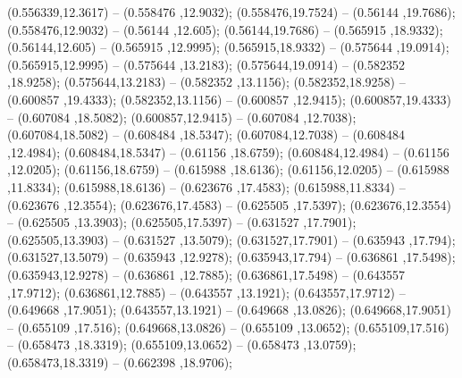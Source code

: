  (0.556339,12.3617) -- (0.558476 ,12.9032);
 (0.558476,19.7524) -- (0.56144 ,19.7686);
 (0.558476,12.9032) -- (0.56144 ,12.605);
 (0.56144,19.7686) -- (0.565915 ,18.9332);
 (0.56144,12.605) -- (0.565915 ,12.9995);
 (0.565915,18.9332) -- (0.575644 ,19.0914);
 (0.565915,12.9995) -- (0.575644 ,13.2183);
 (0.575644,19.0914) -- (0.582352 ,18.9258);
 (0.575644,13.2183) -- (0.582352 ,13.1156);
 (0.582352,18.9258) -- (0.600857 ,19.4333);
 (0.582352,13.1156) -- (0.600857 ,12.9415);
 (0.600857,19.4333) -- (0.607084 ,18.5082);
 (0.600857,12.9415) -- (0.607084 ,12.7038);
 (0.607084,18.5082) -- (0.608484 ,18.5347);
 (0.607084,12.7038) -- (0.608484 ,12.4984);
 (0.608484,18.5347) -- (0.61156 ,18.6759);
 (0.608484,12.4984) -- (0.61156 ,12.0205);
 (0.61156,18.6759) -- (0.615988 ,18.6136);
 (0.61156,12.0205) -- (0.615988 ,11.8334);
 (0.615988,18.6136) -- (0.623676 ,17.4583);
 (0.615988,11.8334) -- (0.623676 ,12.3554);
 (0.623676,17.4583) -- (0.625505 ,17.5397);
 (0.623676,12.3554) -- (0.625505 ,13.3903);
 (0.625505,17.5397) -- (0.631527 ,17.7901);
 (0.625505,13.3903) -- (0.631527 ,13.5079);
 (0.631527,17.7901) -- (0.635943 ,17.794);
 (0.631527,13.5079) -- (0.635943 ,12.9278);
 (0.635943,17.794) -- (0.636861 ,17.5498);
 (0.635943,12.9278) -- (0.636861 ,12.7885);
 (0.636861,17.5498) -- (0.643557 ,17.9712);
 (0.636861,12.7885) -- (0.643557 ,13.1921);
 (0.643557,17.9712) -- (0.649668 ,17.9051);
 (0.643557,13.1921) -- (0.649668 ,13.0826);
 (0.649668,17.9051) -- (0.655109 ,17.516);
 (0.649668,13.0826) -- (0.655109 ,13.0652);
 (0.655109,17.516) -- (0.658473 ,18.3319);
 (0.655109,13.0652) -- (0.658473 ,13.0759);
 (0.658473,18.3319) -- (0.662398 ,18.9706);

